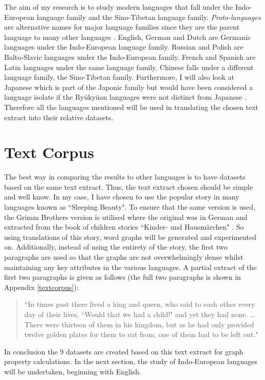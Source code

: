 The aim of my research is to study modern languages that fall under the Indo-European language family and the Sino-Tibetan language family. \emph{Proto-languages} are alternative names for major language families since they are the parent language to many other languages \cite{rowe2022concise}. English, German and Dutch are Germanic languages under the Indo-European language family. Russian and Polish are Balto-Slavic languages under the Indo-European family.  French and Spanish are Latin languages under the same language family. Chinese falls under a different language family, the Sino-Tibetan family. Furthermore, I will also look at Japanese which is part of the Japonic family but would have been considered a language isolate if the Ryūkyūan languages were not distinct from Japanese \cite{campbell2010language}. Therefore all the languages mentioned will be used in translating the chosen text extract into their relative datasets.

\section{Text Corpus}
The best way in comparing the results to other languages is to have datasets based on the same text extract. Thus, the text extract chosen should be simple and well know. In my case, I have chosen to use the popular story in many languages known as ``Sleeping Beauty". To ensure that the same version is used, the Grimm Brothers version is utilised where the original was in German and extracted from the book of children stories ``Kinder- und Hausmärchen" \cite{grimm1857kinder}. So using translations of this story, word graphs will be generated and experimented on.  Additionally, instead of using the entirety of the story, the first two paragraphs are used so that the graphs are not overwhelmingly dense whilst maintaining any key attributes in the various languages. A partial extract of the first two paragraphs is given as follows (the full two paragraphs is shown in Appendix \ref{textcorpus}):
\begin{quote}
``In times past there lived a king and queen, who said to each other every day of their lives, ``Would that we had a child!" and yet they had none. \dots There were thirteen of them in his kingdom, but as he had only provided twelve golden plates for them to eat from, one of them had to be left out."
\end{quote}
In conclusion the 9 datasets are created based on this text extract for graph property calculations. In the next section, the study of Indo-European languages will be undertaken, beginning with English.


